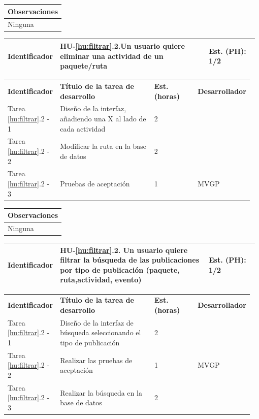 \documentclass[11pt]{article}
\begin{document}
\begin{longtable}{p{1.028\linewidth}}
	\textbf{Observaciones}\\
	\midrule
	Ninguna\\
	\bottomrule
	\bottomrule
\end{longtable}

\centering
\begin{longtable}{p{0.18\linewidth}|p{0.6\linewidth}|p{0.2\linewidth}}
	\toprule
	\toprule
	\textbf{Identificador} & \textbf{HU-\ref{hu:filtrar}.2}.Un usuario quiere eliminar una actividad de un paquete/ruta & \textbf{Est. (PH):} 1/2 \\
	
	\bottomrule
\end{longtable}

\begin{longtable}{p{0.18\linewidth}|p{0.4\linewidth}|p{0.18\linewidth}|p{0.2\linewidth}}
	\toprule
	\textbf{Identificador} & \textbf{Título de la tarea de desarrollo} & \textbf{Est. (horas)} & \textbf{Desarrollador} \\
        Tarea \ref{hu:filtrar}.2 - 1 & Diseño de la interfaz, añadiendo una X al lado de cada actividad & 2 & \\
        Tarea \ref{hu:filtrar}.2 - 2 & Modificar la ruta en la base de datos & 2 & \\
        Tarea \ref{hu:filtrar}.2 - 3 & Pruebas de aceptación & 1 & MVGP\\
	\bottomrule
\end{longtable}

\begin{longtable}{p{1.028\linewidth}}
	\textbf{Observaciones}\\
	\midrule
	Ninguna\\
	\bottomrule
	\bottomrule
\end{longtable}

\centering
\begin{longtable}{p{0.18\linewidth}|p{0.6\linewidth}|p{0.2\linewidth}}
	\toprule
	\toprule
	\textbf{Identificador} & \textbf{HU-\ref{hu:filtrar}.2}. Un usuario quiere filtrar la búsqueda de las publicaciones por tipo de publicación (paquete, ruta,actividad, evento) & \textbf{Est. (PH):} 1/2 \\
	
	\bottomrule
\end{longtable}

\begin{longtable}{p{0.18\linewidth}|p{0.4\linewidth}|p{0.18\linewidth}|p{0.2\linewidth}}
	\toprule
	\textbf{Identificador} & \textbf{Título de la tarea de desarrollo} & \textbf{Est. (horas)} & \textbf{Desarrollador} \\
        Tarea \ref{hu:filtrar}.2 - 1 & Diseño de la interfaz de búsqueda seleccionando el tipo de publicación & 2 &\\
        Tarea \ref{hu:filtrar}.2 - 2 & Realizar las pruebas de aceptación & 1 & MVGP\\
        Tarea \ref{hu:filtrar}.2 - 3 & Realizar la búsqueda en la base de datos & 2 & \\
	\bottomrule
\end{longtable}
\end{document}
